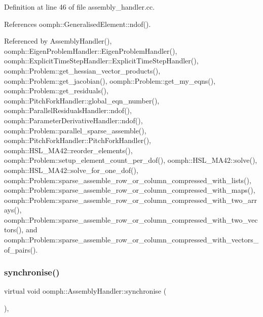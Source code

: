 Definition at line 46 of file assembly\+\_\+handler.\+cc.



References oomph\+::\+Generalised\+Element\+::ndof().



Referenced by Assembly\+Handler(), oomph\+::\+Eigen\+Problem\+Handler\+::\+Eigen\+Problem\+Handler(), oomph\+::\+Explicit\+Time\+Step\+Handler\+::\+Explicit\+Time\+Step\+Handler(), oomph\+::\+Problem\+::get\+\_\+hessian\+\_\+vector\+\_\+products(), oomph\+::\+Problem\+::get\+\_\+jacobian(), oomph\+::\+Problem\+::get\+\_\+my\+\_\+eqns(), oomph\+::\+Problem\+::get\+\_\+residuals(), oomph\+::\+Pitch\+Fork\+Handler\+::global\+\_\+eqn\+\_\+number(), oomph\+::\+Parallel\+Residuals\+Handler\+::ndof(), oomph\+::\+Parameter\+Derivative\+Handler\+::ndof(), oomph\+::\+Problem\+::parallel\+\_\+sparse\+\_\+assemble(), oomph\+::\+Pitch\+Fork\+Handler\+::\+Pitch\+Fork\+Handler(), oomph\+::\+H\+S\+L\+\_\+\+M\+A42\+::reorder\+\_\+elements(), oomph\+::\+Problem\+::setup\+\_\+element\+\_\+count\+\_\+per\+\_\+dof(), oomph\+::\+H\+S\+L\+\_\+\+M\+A42\+::solve(), oomph\+::\+H\+S\+L\+\_\+\+M\+A42\+::solve\+\_\+for\+\_\+one\+\_\+dof(), oomph\+::\+Problem\+::sparse\+\_\+assemble\+\_\+row\+\_\+or\+\_\+column\+\_\+compressed\+\_\+with\+\_\+lists(), oomph\+::\+Problem\+::sparse\+\_\+assemble\+\_\+row\+\_\+or\+\_\+column\+\_\+compressed\+\_\+with\+\_\+maps(), oomph\+::\+Problem\+::sparse\+\_\+assemble\+\_\+row\+\_\+or\+\_\+column\+\_\+compressed\+\_\+with\+\_\+two\+\_\+arrays(), oomph\+::\+Problem\+::sparse\+\_\+assemble\+\_\+row\+\_\+or\+\_\+column\+\_\+compressed\+\_\+with\+\_\+two\+\_\+vectors(), and oomph\+::\+Problem\+::sparse\+\_\+assemble\+\_\+row\+\_\+or\+\_\+column\+\_\+compressed\+\_\+with\+\_\+vectors\+\_\+of\+\_\+pairs().

\mbox{\label{classoomph_1_1AssemblyHandler_a0ccef21253d997dd1a78ed26c2b99fce}} 
\subsubsection{\texorpdfstring{synchronise()}{synchronise()}}
{\footnotesize\ttfamily virtual void oomph\+::\+Assembly\+Handler\+::synchronise (\begin{DoxyParamCaption}{ }\end{DoxyParamCaption})\hspace{0.3cm}{\ttfamily [inline]}, {\ttfamily [virtual]}}



